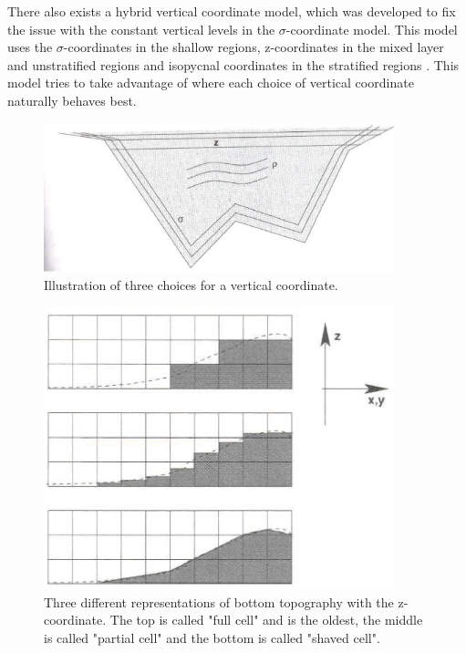 There also exists a hybrid vertical coordinate model, which was developed to fix the issue with the constant vertical levels in the $\sigma$-coordinate model.  This model uses the $\sigma$-coordinates in the shallow regions, z-coordinates in the mixed layer and unstratified regions and isopycnal coordinates in the stratified regions \cite{00GBBCGHHTW, 03CSHB}.  This model tries to take advantage of where each choice of vertical coordinate naturally behaves best.

\begin{center}
\begin{figure}[h!]
\centering
  \includegraphics[width=4in]{Images/3Regimes}
  \caption[Vertical coordinates]{Illustration of three choices for a vertical coordinate.\protect \cite{04Gri}}\label{f:3Regimes}
\end{figure}
\end{center}

\begin{center}
\begin{figure}[h!]
\centering
  \includegraphics[width=4in]{Images/BotTopo}
  \caption[Z-coordinate options]{Three different representations of bottom topography with the z-coordinate.  The top is called "full cell" and is the oldest, the middle is called "partial cell" and the bottom is called "shaved cell".\protect \cite{04Gri}}\label{f:BotTopo}
\end{figure}
\end{center}

